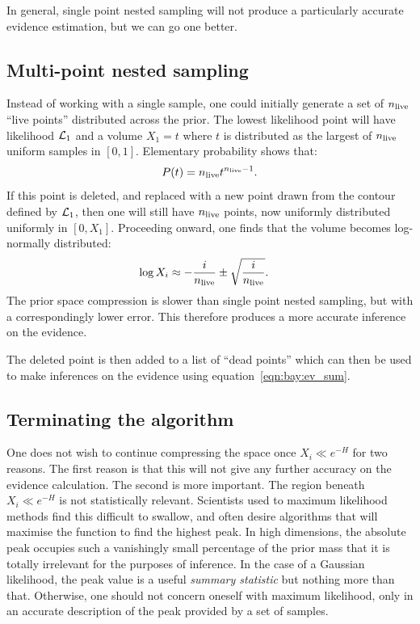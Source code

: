 In general, single point nested sampling will not produce a particularly accurate evidence estimation, but we can go one better.


\subsection{Multi-point nested sampling}
Instead of working with a single sample, one could initially generate a set of $n_{\mathrm{live}}$ ``live points'' distributed across the prior. The lowest likelihood point will have likelihood $\mathcal{L}_1$ and a volume $X_1 = t$ where $t$ is distributed as the largest of $n_{\mathrm{live}}$ uniform samples in $[0,1]$. Elementary probability shows that:
\begin{equation}
  P(t) = n_{\mathrm{live}} t^{n_{\mathrm{live}}-1}.
  \label{eqn:bay:t_prob}
\end{equation}
If this point is deleted, and replaced with a new point drawn from the contour defined by $\mathcal{L}_1$, then one will still have $n_{\mathrm{live}}$ points, now uniformly distributed uniformly in $[0,X_1]$. Proceeding onward, one finds that the volume becomes log-normally distributed:
\begin{align}
  \log X_i  &\approx -\frac{i}{n_{\mathrm{live}}} \pm \sqrt{\frac{i}{n_{\mathrm{live}}}}.
  \label{eqn:bay:log_normal_1_n}
\end{align}
The prior space compression is slower than single point nested sampling, but with a correspondingly lower error. This therefore produces a more accurate inference on the evidence.

The deleted point is then added to a list of ``dead points'' which can then be used to make inferences on the evidence using equation~\eqref{eqn:bay:ev_sum}.

\subsection{Terminating the algorithm}
One does not wish to continue compressing the space once $X_i\ll e^{-H}$ for two reasons. The first reason is that this will not give any further accuracy on the evidence calculation. The second is more important. The region beneath $X_i\ll e^{-H}$ is not statistically relevant. Scientists used to maximum likelihood methods find this difficult to swallow, and often desire algorithms that will maximise the function to find the highest peak. In high dimensions, the absolute peak occupies such a vanishingly small percentage of the prior mass that it is totally irrelevant for the purposes of inference. In the case of a Gaussian likelihood, the peak value is a useful {\em summary statistic\/} but nothing more than that. Otherwise, one should not concern oneself with maximum likelihood, only in an accurate description of the peak provided by a set of samples.

